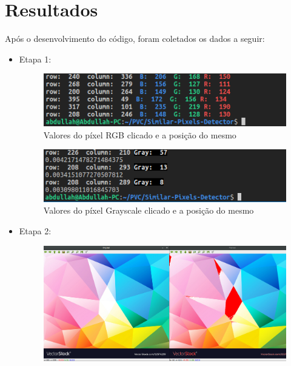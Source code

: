 \documentclass{bmvc2k}
\begin{document}
\section{Resultados}
    Após o desenvolvimento do código, foram coletados os dados a seguir:
    \begin{itemize}
        \item  Etapa 1:
            \begin{figure}[!ht]
                \centering
                \includegraphics[scale=.60]{Figs/printpixrgb.png}
                \vspace{-3mm}
                \caption{Valores do píxel RGB clicado e a posição do mesmo}
                \label{fig:terminalrgb}
            \end{figure}
            \begin{figure}[!ht]
                \centering
                \includegraphics[scale=.60]{Figs/printpixgray.png}
                \vspace{-3mm}
                \caption{Valores do píxel Grayscale clicado e a posição do mesmo}
                \label{fig:terminalgray}
            \end{figure}
        \item Etapa 2:
            \begin{figure}[!ht]
                \centering
                \includegraphics[scale=.16]{Figs/coloreddemonst.png}

\end{figure}
\end{itemize}
\end{document}
